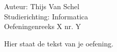 \documentclass[a4paper]{article}
\begin{document}
  
\noindent \large Auteur: Thijs Van Schel \\
\noindent \large Studierichting: Informatica\\
\noindent \large Oefeningenreeks X nr. Y\\

\medskip

\normalsize

Hier staat de tekst van je oefening.

\begin{thebibliography}{999}
\end{thebibliography}
\end{document}
